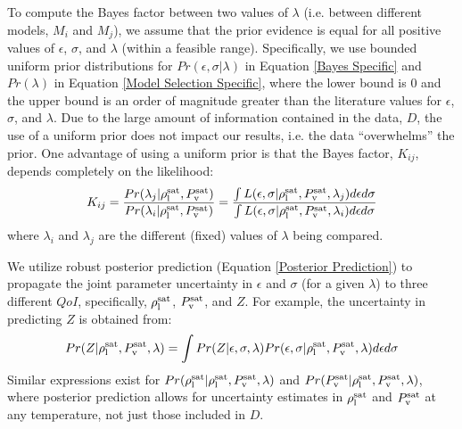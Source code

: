 \documentclass[preprint,letterpaper,floatfix,citeautoscript,aip,jcp]{revtex4-1}
\begin{document}
To compute the Bayes factor between two values of $\lambda$ 
(i.e. between different models, $M_i$ and $M_j$), we assume that the prior evidence is equal for all positive values of $\epsilon$, $\sigma$, and $\lambda$ (within a feasible range). Specifically, we use bounded uniform prior distributions for $Pr(\epsilon,\sigma|\lambda)$ in Equation \ref{Bayes Specific} and $Pr(\lambda)$ in Equation \ref{Model Selection Specific}, where the lower bound is 0 and the upper bound is an order of magnitude greater than the literature values for $\epsilon$, $\sigma$, and $\lambda$. Due to the large amount of information contained in the data, $D$, the use of a uniform prior does not impact our results, i.e. the data ``overwhelms'' the prior.
One advantage of using a uniform prior is that the Bayes factor, $K_{ij}$, depends completely on the likelihood:
\begin{equation} \label{Bayes Factor}
K_{ij} = \frac{Pr(\lambda_j|\rho_{\rm l}^{\rm sat},P_{\rm v}^{\rm sat})}{Pr(\lambda_i|\rho_{\rm l}^{\rm sat},P_{\rm v}^{\rm sat})} = \frac{ \int L(\epsilon,\sigma|\rho_{\rm l}^{\rm sat},P_{\rm v}^{\rm sat},\lambda_j) d\epsilon d\sigma}{ \int L(\epsilon,\sigma|\rho_{\rm l}^{\rm sat},P_{\rm v}^{\rm sat},\lambda_i) d\epsilon d\sigma}
\end{equation}
where $\lambda_i$ and $\lambda_j$ are the different (fixed) values of $\lambda$ being compared.

We utilize robust posterior prediction (Equation \ref{Posterior Prediction}) to propagate the joint parameter uncertainty in $\epsilon$ and $\sigma$ (for a given $\lambda$) to three different $QoI$, specifically, $\rho_{\rm l}^{\rm sat}$, $P_{\rm v}^{\rm sat}$, and $Z$. For example, the uncertainty in predicting $Z$ 
is obtained from:
\begin{equation} \label{Posterior Prediction Z}
Pr(Z|\rho_{\rm l}^{\rm sat},P_{\rm v}^{\rm sat},\lambda) = \int Pr(Z|\epsilon,\sigma,\lambda) Pr(\epsilon, \sigma|\rho_{\rm l}^{\rm sat},P_{\rm v}^{\rm sat},\lambda) d\epsilon d\sigma
\end{equation}
Similar expressions exist for $Pr(\rho_{\rm l}^{\rm sat}|\rho_{\rm l}^{\rm sat},P_{\rm v}^{\rm sat},\lambda)$ and $Pr(P_{\rm v}^{\rm sat}|\rho_{\rm l}^{\rm sat},P_{\rm v}^{\rm sat},\lambda)$, where posterior prediction allows for uncertainty estimates in $\rho_{\rm l}^{\rm sat}$ and $P_{\rm v}^{\rm sat}$ at any temperature, not just those included in $D$. 
\end{document}
